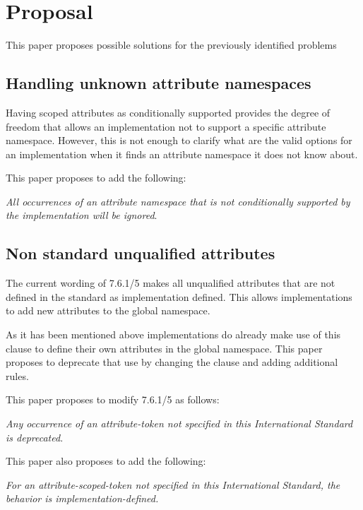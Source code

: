 \section{Proposal}

This paper proposes possible solutions for the previously identified problems

\subsection{Handling unknown attribute namespaces}

Having scoped attributes as conditionally supported provides the degree of
freedom that allows an implementation not to support a specific attribute namespace.
However, this is not enough to clarify what are the valid options for an
implementation when it finds an attribute namespace it does not know about.

This paper proposes to add the following:

\vspace{1em}
\emph{All occurrences of an attribute namespace that is not conditionally supported
by the implementation will be ignored}.

\subsection{Non standard unqualified attributes}

The current wording of 7.6.1/5 makes all unqualified attributes that are not defined
in the standard as implementation defined. This allows implementations to add new
attributes to the global namespace.

As it has been mentioned above implementations do already make use of this clause
to define their own attributes in the global namespace. This paper proposes
to deprecate that use by changing the clause and adding additional rules.

This paper proposes to modify 7.6.1/5 as follows:

\vspace{1em}
\emph{Any occurrence of an attribute-token not specified in this International
Standard is deprecated}.
\vspace{1em}

This paper also proposes to add the following:

\vspace{1em}
\emph{For an attribute-scoped-token not specified in this International
Standard, the behavior is implementation-defined.}

